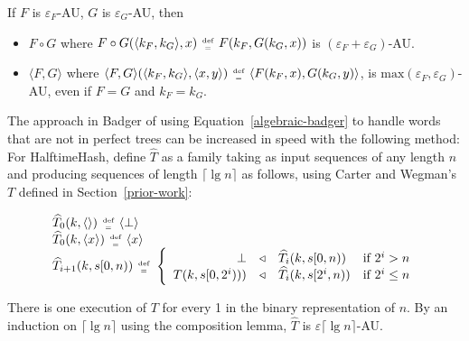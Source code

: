 \documentclass[runningheads]{llncs}
\newcommand{\defeq}{\;\genfrac{}{}{0pt}{2}{\text{def}}{=}\;}
\begin{document}
\begin{lemma}
  If $F$ is $\varepsilon_F$-AU, $G$ is $\varepsilon_G$-AU, then
  \begin{itemize}
  \item $F \circ G$ where $F \circ G (\langle k_F, k_G \rangle, x) \defeq F(k_F,G(k_G, x))$ is $(\varepsilon_F + \varepsilon_G)$-AU.
  \item $\langle F, G\rangle$ where $\langle F, G \rangle(\langle k_F, k_G \rangle, \langle x, y \rangle) \defeq \langle F(k_F,x), G(k_G,y) \rangle$, is $\text{max}(\varepsilon_F, \varepsilon_G)$-AU, even if $F=G$ and $k_F = k_G$.
  \end{itemize}
\end{lemma}

The approach in Badger of using Equation~\ref{algebraic-badger} to handle words that are not in perfect trees can be increased in speed with the following method:
For HalftimeHash, define $\widehat{T}$ as a family taking as input sequences of any length $n$ and producing sequences of length $\lceil \lg n \rceil$ as follows, using Carter and Wegman's $T$ defined in Section~\ref{prior-work}:

\begin{equation}
\label{stack-construction}
\begin{array}{l}
\widehat{T}_0(k, \langle \rangle) \defeq \langle \bot \rangle \\
\widehat{T}_0(k, \langle x \rangle) \defeq \langle x \rangle \\
\widehat{T}_{i+1}(k, s[0,n)) \defeq \left\{
  \begin{array}{rcll}
   \bot &\triangleleft& \widehat{T}_i(k, s[0,n)) & \text{if } 2^i > n \\
    T(k, s[0, 2^i))) &\triangleleft& \widehat{T}_{i}(k,s[2^i, n)) & \text{if } 2^i \le n
  \end{array}
  \right.
\end{array}
\end{equation}

There is one execution of $T$ for every 1 in the binary representation of $n$.
By an induction on $\lceil \lg n \rceil$ using the composition lemma, $\widehat{T}$ is $\varepsilon \lceil \lg n \rceil$-AU.
\end{document}
